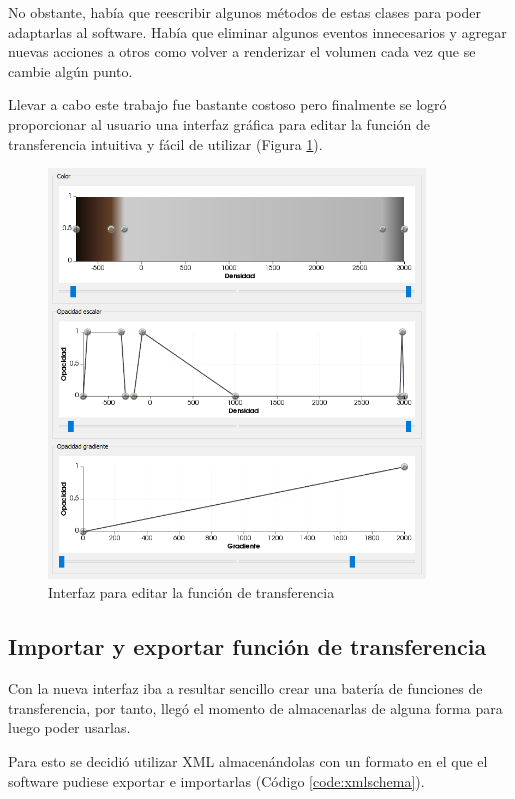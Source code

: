 No obstante, había que reescribir algunos métodos de estas clases para poder adaptarlas al software. Había que eliminar algunos eventos innecesarios y agregar nuevas acciones a otros como volver a renderizar el volumen cada vez que se cambie algún punto.

Llevar a cabo este trabajo fue bastante costoso pero finalmente se logró proporcionar al usuario una interfaz gráfica para editar la función de transferencia intuitiva y fácil de utilizar (Figura \ref{fig:gui_final_tf}).

\begin{figure}[H]
	\centering
	\includegraphics[width=10cm]{imagenes/gui_final_tf}
	\caption{Interfaz para editar la función de transferencia}
	\label{fig:gui_final_tf}
\end{figure}

\subsection{Importar y exportar función de transferencia}

Con la nueva interfaz iba a resultar sencillo crear una batería de funciones de transferencia, por tanto, llegó el momento de almacenarlas de alguna forma para luego poder usarlas.

Para esto se decidió utilizar XML almacenándolas con un formato en el que el software pudiese exportar e importarlas (Código \ref{code:xmlschema}).



